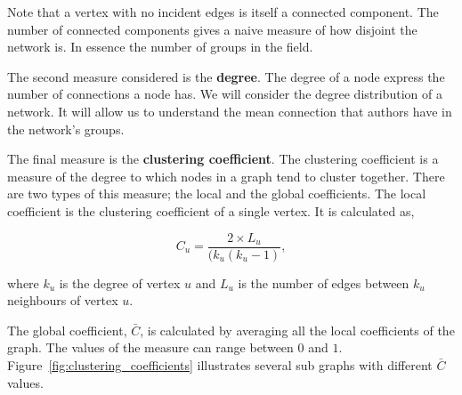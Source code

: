 \documentclass{article}
\theoremstyle{definition}
\begin{document}
Note that a vertex with no incident edges is itself a connected component.
The number of connected components gives a naive measure of how disjoint the network is.
In essence the number of groups in the field.

The second measure considered is the \textbf{degree}. The degree of a node express
the number of connections a node has. We will consider the degree distribution
of a network. It will allow us to understand the mean connection that authors
have in the network's groups.

The final measure is the \textbf{clustering coefficient}. The clustering coefficient is a
measure of the degree to which nodes in a graph tend to cluster together. There
are two types of this measure; the local and the global coefficients. The local
coefficient is the clustering coefficient of a single vertex. It is calculated as,

\[C_u = \frac{2 \times L_u}{(k_u (k_u - 1)},\]

where \(k_u\) is the degree of vertex \(u\) and \(L_u\) is the number of edges
between \(k_u\) neighbours of vertex \(u\).

The global coefficient, \(\bar{C}\), is calculated by averaging all the local
coefficients of the graph. The values of the measure can range between \(0\) and
\(1\). Figure~\ref{fig:clustering_coefficients} illustrates several sub graphs
with different \(\bar{C}\) values.
\end{document}
